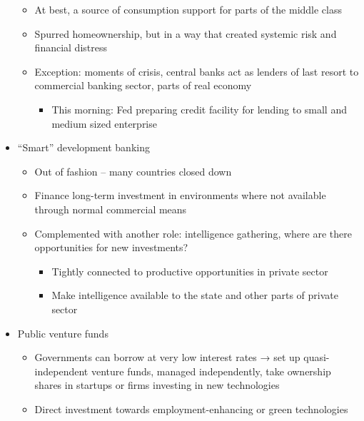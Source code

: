 \begin{itemize}
  \begin{itemize}
  \tightlist
  \item
    At best, a source of consumption support for parts of the middle
    class
  \item
    Spurred homeownership, but in a way that created systemic risk and
    financial distress
  \item
    Exception: moments of crisis, central banks act as lenders of last
    resort to commercial banking sector, parts of real economy

    \begin{itemize}
    \tightlist
    \item
      This morning: Fed preparing credit facility for lending to small
      and medium sized enterprise
    \end{itemize}
  \end{itemize}
\item
  ``Smart'' development banking

  \begin{itemize}
  \tightlist
  \item
    Out of fashion -- many countries closed down
  \item
    Finance long-term investment in environments where not available
    through normal commercial means
  \item
    Complemented with another role: intelligence gathering, where are
    there opportunities for new investments?

    \begin{itemize}
    \tightlist
    \item
      Tightly connected to productive opportunities in private sector
    \item
      Make intelligence available to the state and other parts of
      private sector
    \end{itemize}
  \end{itemize}
\item
  Public venture funds

  \begin{itemize}
  \tightlist
  \item
    Governments can borrow at very low interest rates → set up
    quasi-independent venture funds, managed independently, take
    ownership shares in startups or firms investing in new technologies
  \item
    Direct investment towards employment-enhancing or green technologies
  \end{itemize}
\end{itemize}

